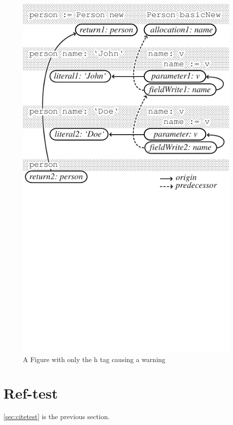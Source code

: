 \documentclass[10pt]{article}
\begin{document}
\begin{figure}[h]
	\centering
	\includegraphics{objectflow.pdf}
	\caption{A Figure with only the h tag causing a warning}
	\label{fig:htWarning}
\end{figure}





\section{Ref-test}
\ref{sec:citetest} is the previous section.

\end{document}
